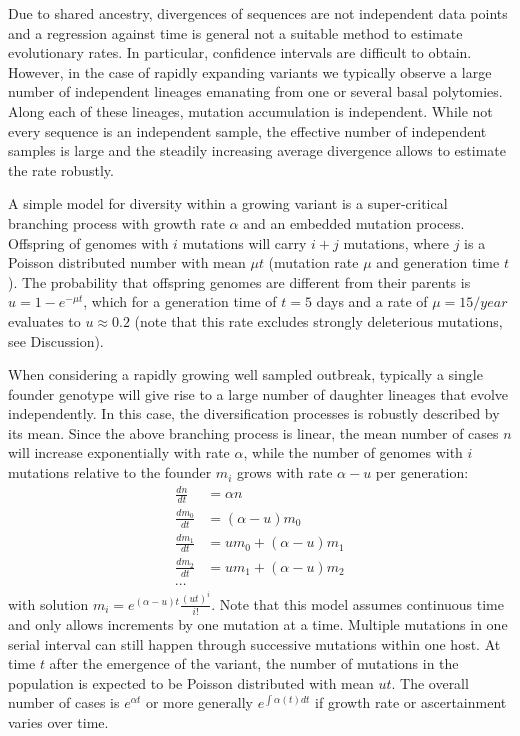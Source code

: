 \documentclass[aps,rmp, twocolumn]{revtex4}
\begin{document}
Due to shared ancestry, divergences of sequences are not independent data points and a regression against time is general not a suitable method to estimate evolutionary rates.
In particular, confidence intervals are difficult to obtain.
However, in the case of rapidly expanding variants we typically observe a large number of independent lineages emanating from one or several basal polytomies.
Along each of these lineages, mutation accumulation is independent.
While not every sequence is an independent sample, the effective number of independent samples is large and the steadily increasing average divergence allows to estimate the rate robustly.

A simple model for diversity within a growing variant is a super-critical branching process with growth rate $\alpha$ and an embedded mutation process.
Offspring of genomes with $i$ mutations will carry $i+j$ mutations, where $j$ is a Poisson distributed number with mean $\mu t$ (mutation rate $\mu$ and generation time $t$).
The probability that offspring genomes are different from their parents is $u = 1-e^{-\mu t}$, which for a generation time of $t=5$ days and a rate of $\mu = 15/year$ evaluates to $u\approx 0.2$ (note that this rate excludes strongly deleterious mutations, see Discussion).

When considering a rapidly growing well sampled outbreak, typically a single founder genotype will give rise to a large number of daughter lineages that evolve independently.
In this case, the diversification processes is robustly described by its mean.
Since the above branching process is linear, the mean number of cases $n$ will increase exponentially with rate $\alpha$, while the number of genomes with $i$ mutations relative to the founder $m_i$ grows with rate $\alpha - u$ per generation:
\begin{equation}
    \begin{split}
        \frac{dn}{dt} &= \alpha n \\
        \frac{dm_0}{dt} &= (\alpha - u) m_0 \\
        \frac{dm_1}{dt} &= u m_0 + (\alpha - u) m_1 \\
        \frac{dm_2}{dt} &= u m_1 + (\alpha - u) m_2 \\
        \cdots
    \end{split}
\end{equation}
with solution $m_i = e^{(\alpha - u)t} \frac{(ut)^i}{i!}$.
Note that this model assumes continuous time and only allows increments by one mutation at a time.
Multiple mutations in one serial interval can still happen through successive mutations within one host.
At time $t$ after the emergence of the variant, the number of mutations in the population is expected to be Poisson distributed with mean $ut$.
The overall number of cases is $e^{\alpha t}$ or more generally $e^{\int \alpha(t) dt}$ if growth rate or ascertainment varies over time.
\end{document}

